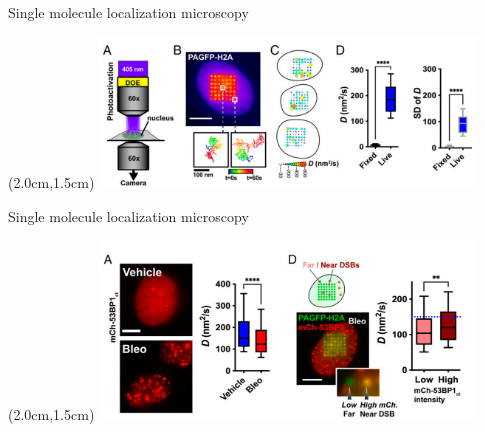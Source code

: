 \documentclass{beamer}					%
\begin{document}
\begin{frame}{Single molecule localization microscopy}
\begin{textblock*}{10cm}(2.0cm,1.5cm)
\includegraphics[width=10cm]{../../postdoc/sartorius/media/DOE.png}
\end{textblock*}
\end{frame}

\begin{frame}{Single molecule localization microscopy}
\begin{textblock*}{10cm}(2.0cm,1.5cm)
\includegraphics[width=10cm]{../../postdoc/sartorius/media/Bleo.png}
\end{textblock*}
\end{frame}
\end{document}

